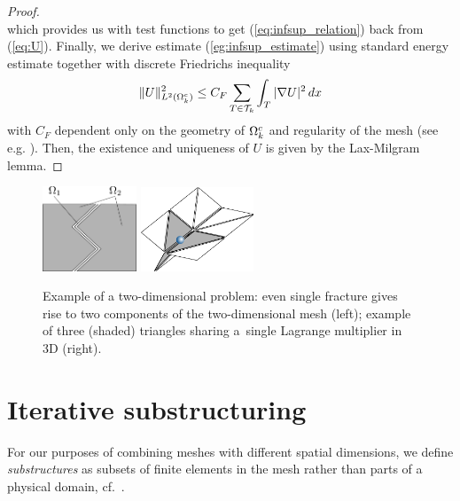 {\begin{proof}
\begin{equation*}
\end{equation*}
which provides us with test functions to get (\ref{eq:infsup_relation}) back 
from (\ref{eq:U}). Finally, we derive estimate 
(\ref{eg:infsup_estimate}) using standard energy estimate together with 
discrete Friedrichs inequality 
\begin{equation*}
  \|U\|^2_{L^{2}(\Omega^c_k)} \le C_F 
\sum_{T\in\mathcal{T}_k} \int_T |\nabla U|^2\, dx
\end{equation*}
with $C_F$ dependent only on the geometry of $\Omega^c_k$ and regularity of 
the 
mesh (see e.g. \cite{Vohralik-2005-ODP}). 
Then, the existence and uniqueness of $U$ is 
given by the Lax-Milgram lemma.
\end{proof}
}

\begin{figure}[tbh]
\begin{center}
\includegraphics[width=0.25\textwidth]{figs/components} \hspace{25mm} 
\includegraphics[width=0.30\textwidth]{figs/starlike-conf}
\end{center}
\caption{\label{fig:schemes}
Example of a two-dimensional problem: even single fracture gives rise to two components of the two-dimensional mesh (left);
example of three (shaded) triangles sharing a~single Lagrange multiplier in 3D (right).}
\end{figure}

\section{Iterative substructuring}

\label{sec:substructuring}

For our purposes of combining meshes with different spatial dimensions, we
define \emph{substructures} as subsets of finite elements in the mesh rather
than parts of a physical domain, cf.~\cite{Toselli-2005-DDM}.

